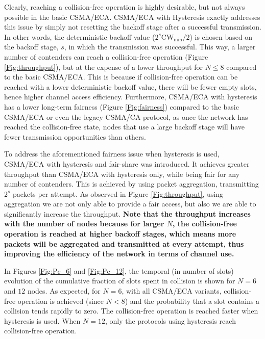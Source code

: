 \documentclass[conference]{IEEEtran}
\newcommand{\Az}[1]{{\bf{#1}}}
\begin{document}
Clearly, reaching a collision-free operation is highly desirable, but not always possible in the basic CSMA/ECA. CSMA/ECA with Hysteresis exactly addresses this issue by simply not resetting the backoff stage after a successful transmission. In other words, the deterministic backoff value ($2^s \text{CW}_{\min}/2$) is chosen based on the backoff stage, $s$, in which the transmission was successful. This way, a larger number of contenders can reach a collision-free operation (Figure \ref{Fig:throughput}), but at the expense of a lower throughput for $N\leq 8$ compared to the basic CSMA/ECA. This is because if collision-free operation can be reached with a lower deterministic backoff value, there will be fewer empty slots, hence higher channel access efficiency. Furthermore, CSMA/ECA with hysteresis has a lower long-term fairness (Figure \ref{Fig:fairness}) compared to the basic CSMA/ECA or even the legacy CSMA/CA protocol, as once the network has reached the collision-free state, nodes that use a large backoff stage will have fewer transmission opportunities than others.

To address the aforementioned fairness issue when hysteresis is used, CSMA/ECA with hysteresis and fair-share was introduced. It achieves greater throughput than CSMA/ECA with hysteresis only, while being fair for any number of contenders. This is achieved by using packet aggregation, transmitting $2^s$ packets per attempt. As observed in Figure \ref{Fig:throughput}, using aggregation we are not only able to provide a fair access, but also we are able to significantly increase the throughput. \Az{Note that the throughput increases with the number of nodes because for larger $N$, the collision-free operation is reached at higher backoff stages, which means more packets will be aggregated and transmitted at every attempt, thus improving the efficiency of the network in terms of channel use.}

In Figures \ref{Fig:Pc_6} and \ref{Fig:Pc_12}, the temporal (in number of slots) evolution of the cumulative fraction of slots spent in collision is shown for $N = 6$ and $12$ nodes. As expected, for $N=6$, with all CSMA/ECA variants, collision-free operation is achieved (since $N<8$) and the probability that a slot contains a collision tends rapidly to zero. The collision-free operation is reached faster when hysteresis is used. When $N=12$, only the protocols using hysteresis reach collision-free operation. 
\end{document}
